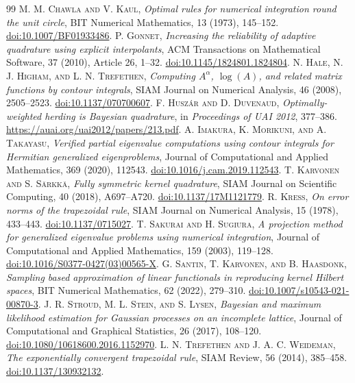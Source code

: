 \documentclass[final,leqno,letterpaper]{etna}
\begin{document}
\begin{thebibliography}{99}
 \textsc{M. M. Chawla and V. Kaul}, \emph{Optimal rules for numerical integration round the unit circle}, BIT Numerical Mathematics, 13 (1973), 145--152. \href{https://doi.org/10.1007/BF01933486}{doi:10.1007/BF01933486}.
 \textsc{P. Gonnet}, \emph{Increasing the reliability of adaptive quadrature using explicit interpolants}, ACM Transactions on Mathematical Software, 37 (2010), Article 26, 1--32. \href{https://doi.org/10.1145/1824801.1824804}{doi:10.1145/1824801.1824804}.
 \textsc{N. Hale, N. J. Higham, and L. N. Trefethen}, \emph{Computing $A^\alpha$, $\log(A)$, and related matrix functions by contour integrals}, SIAM Journal on Numerical Analysis, 46 (2008), 2505--2523. \href{https://doi.org/10.1137/070700607}{doi:10.1137/070700607}.
 \textsc{F. Husz\'ar and D. Duvenaud}, \emph{Optimally-weighted herding is Bayesian quadrature}, in \emph{Proceedings of UAI 2012}, 377--386. \url{https://auai.org/uai2012/papers/213.pdf}.
 \textsc{A. Imakura, K. Morikuni, and A. Takayasu}, \emph{Verified partial eigenvalue computations using contour integrals for Hermitian generalized eigenproblems}, Journal of Computational and Applied Mathematics, 369 (2020), 112543. \href{https://doi.org/10.1016/j.cam.2019.112543}{doi:10.1016/j.cam.2019.112543}.
 \textsc{T. Karvonen and S. S\"arkk\"a}, \emph{Fully symmetric kernel quadrature}, SIAM Journal on Scientific Computing, 40 (2018), A697--A720. \href{https://doi.org/10.1137/17M1121779}{doi:10.1137/17M1121779}.
 \textsc{R. Kress}, \emph{On error norms of the trapezoidal rule}, SIAM Journal on Numerical Analysis, 15 (1978), 433--443. \href{https://doi.org/10.1137/0715027}{doi:10.1137/0715027}.
 \textsc{T. Sakurai and H. Sugiura}, \emph{A projection method for generalized eigenvalue problems using numerical integration}, Journal of Computational and Applied Mathematics, 159 (2003), 119--128. \href{https://doi.org/10.1016/S0377-0427(03)00565-X}{doi:10.1016/S0377-0427(03)00565-X}.
 \textsc{G. Santin, T. Karvonen, and B. Haasdonk}, \emph{Sampling based approximation of linear functionals in reproducing kernel Hilbert spaces}, BIT Numerical Mathematics, 62 (2022), 279--310. \href{https://doi.org/10.1007/s10543-021-00870-3}{doi:10.1007/s10543-021-00870-3}.
 \textsc{J. R. Stroud, M. L. Stein, and S. Lysen}, \emph{Bayesian and maximum likelihood estimation for Gaussian processes on an incomplete lattice}, Journal of Computational and Graphical Statistics, 26 (2017), 108--120. \href{https://doi.org/10.1080/10618600.2016.1152970}{doi:10.1080/10618600.2016.1152970}.
 \textsc{L. N. Trefethen and J. A. C. Weideman}, \emph{The exponentially convergent trapezoidal rule}, SIAM Review, 56 (2014), 385--458. \href{https://doi.org/10.1137/130932132}{doi:10.1137/130932132}.
\end{thebibliography}
\end{document}
